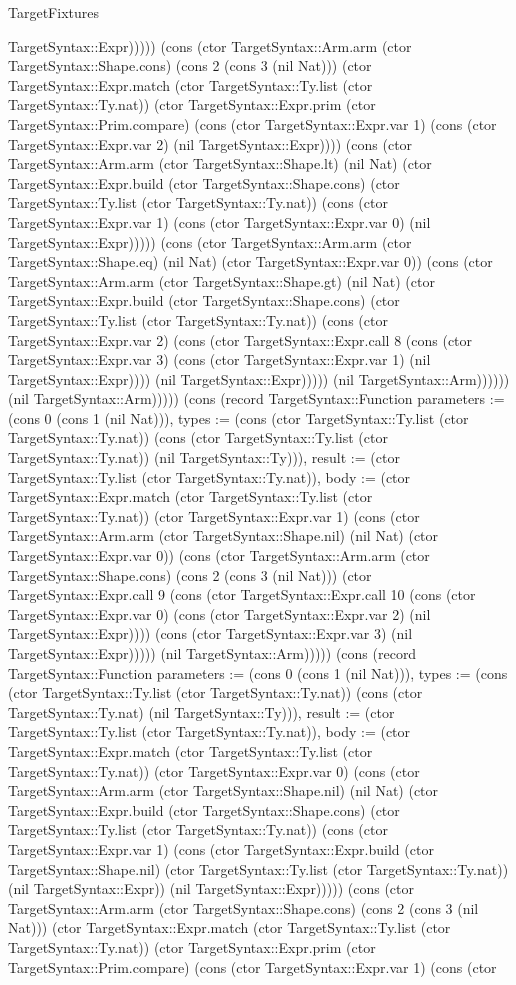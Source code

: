 \begin{lexlean}{TargetFixtures}
\begin{semanticmodule}
{TargetSyntax::Expr))))) (cons (ctor TargetSyntax::Arm.arm (ctor TargetSyntax::Shape.cons) (cons 2 (cons 3 (nil Nat))) (ctor TargetSyntax::Expr.match (ctor TargetSyntax::Ty.list (ctor TargetSyntax::Ty.nat)) (ctor TargetSyntax::Expr.prim (ctor TargetSyntax::Prim.compare) (cons (ctor TargetSyntax::Expr.var 1) (cons (ctor TargetSyntax::Expr.var 2) (nil TargetSyntax::Expr)))) (cons (ctor TargetSyntax::Arm.arm (ctor TargetSyntax::Shape.lt) (nil Nat) (ctor TargetSyntax::Expr.build (ctor TargetSyntax::Shape.cons) (ctor TargetSyntax::Ty.list (ctor TargetSyntax::Ty.nat)) (cons (ctor TargetSyntax::Expr.var 1) (cons (ctor TargetSyntax::Expr.var 0) (nil TargetSyntax::Expr))))) (cons (ctor TargetSyntax::Arm.arm (ctor TargetSyntax::Shape.eq) (nil Nat) (ctor TargetSyntax::Expr.var 0)) (cons (ctor TargetSyntax::Arm.arm (ctor TargetSyntax::Shape.gt) (nil Nat) (ctor TargetSyntax::Expr.build (ctor TargetSyntax::Shape.cons) (ctor TargetSyntax::Ty.list (ctor TargetSyntax::Ty.nat)) (cons (ctor TargetSyntax::Expr.var 2) (cons (ctor TargetSyntax::Expr.call 8 (cons (ctor TargetSyntax::Expr.var 3) (cons (ctor TargetSyntax::Expr.var 1) (nil TargetSyntax::Expr)))) (nil TargetSyntax::Expr))))) (nil TargetSyntax::Arm)))))) (nil TargetSyntax::Arm))))}) (cons (record TargetSyntax::Function {parameters := (cons 0 (cons 1 (nil Nat))), types := (cons (ctor TargetSyntax::Ty.list (ctor TargetSyntax::Ty.nat)) (cons (ctor TargetSyntax::Ty.list (ctor TargetSyntax::Ty.nat)) (nil TargetSyntax::Ty))), result := (ctor TargetSyntax::Ty.list (ctor TargetSyntax::Ty.nat)), body := (ctor TargetSyntax::Expr.match (ctor TargetSyntax::Ty.list (ctor TargetSyntax::Ty.nat)) (ctor TargetSyntax::Expr.var 1) (cons (ctor TargetSyntax::Arm.arm (ctor TargetSyntax::Shape.nil) (nil Nat) (ctor TargetSyntax::Expr.var 0)) (cons (ctor TargetSyntax::Arm.arm (ctor TargetSyntax::Shape.cons) (cons 2 (cons 3 (nil Nat))) (ctor TargetSyntax::Expr.call 9 (cons (ctor TargetSyntax::Expr.call 10 (cons (ctor TargetSyntax::Expr.var 0) (cons (ctor TargetSyntax::Expr.var 2) (nil TargetSyntax::Expr)))) (cons (ctor TargetSyntax::Expr.var 3) (nil TargetSyntax::Expr))))) (nil TargetSyntax::Arm))))}) (cons (record TargetSyntax::Function {parameters := (cons 0 (cons 1 (nil Nat))), types := (cons (ctor TargetSyntax::Ty.list (ctor TargetSyntax::Ty.nat)) (cons (ctor TargetSyntax::Ty.nat) (nil TargetSyntax::Ty))), result := (ctor TargetSyntax::Ty.list (ctor TargetSyntax::Ty.nat)), body := (ctor TargetSyntax::Expr.match (ctor TargetSyntax::Ty.list (ctor TargetSyntax::Ty.nat)) (ctor TargetSyntax::Expr.var 0) (cons (ctor TargetSyntax::Arm.arm (ctor TargetSyntax::Shape.nil) (nil Nat) (ctor TargetSyntax::Expr.build (ctor TargetSyntax::Shape.cons) (ctor TargetSyntax::Ty.list (ctor TargetSyntax::Ty.nat)) (cons (ctor TargetSyntax::Expr.var 1) (cons (ctor TargetSyntax::Expr.build (ctor TargetSyntax::Shape.nil) (ctor TargetSyntax::Ty.list (ctor TargetSyntax::Ty.nat)) (nil TargetSyntax::Expr)) (nil TargetSyntax::Expr))))) (cons (ctor TargetSyntax::Arm.arm (ctor TargetSyntax::Shape.cons) (cons 2 (cons 3 (nil Nat))) (ctor TargetSyntax::Expr.match (ctor TargetSyntax::Ty.list (ctor TargetSyntax::Ty.nat)) (ctor TargetSyntax::Expr.prim (ctor TargetSyntax::Prim.compare) (cons (ctor TargetSyntax::Expr.var 1) (cons (ctor }
\end{semanticmodule}
\end{lexlean}
